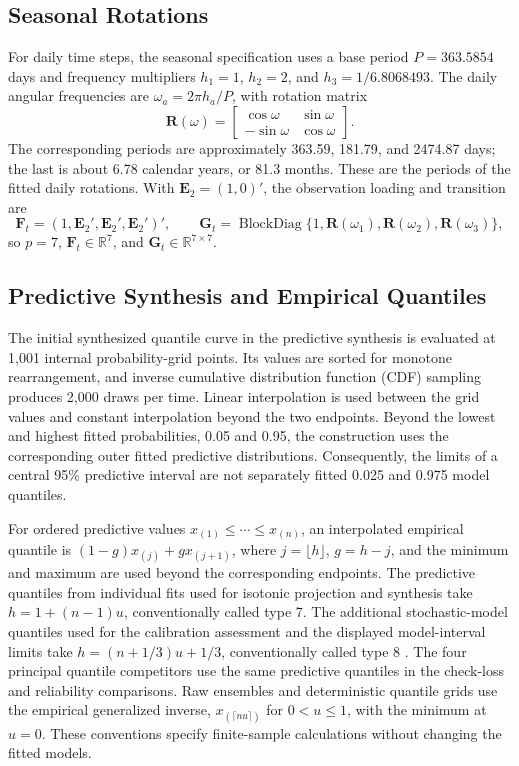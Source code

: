 \documentclass[APA,STIX1COL]{WileyNJD-v2}
\begin{document}
\subsection{Seasonal Rotations}
\label{app:seasonalconstruction}

For daily time steps, the seasonal specification uses a base period \(P=363.5854\) days and frequency multipliers \(h_1=1\), \(h_2=2\), and \(h_3=1/6.8068493\). The daily angular frequencies are \(\omega_a=2\pi h_a/P\), with rotation matrix
\[
\mathbf R(\omega)=
\begin{bmatrix}\cos\omega&\sin\omega\\-\sin\omega&\cos\omega\end{bmatrix}.
\]
The corresponding periods are approximately 363.59, 181.79, and 2474.87 days; the last is about 6.78 calendar years, or 81.3 months. These are the periods of the fitted daily rotations. With \(\mathbf E_2=(1,0)'\), the observation loading and transition are
\[
\mathbf F_t=(1,\mathbf E_2',\mathbf E_2',\mathbf E_2')',\qquad
\mathbf G_t=\operatorname{BlockDiag}\{1,\mathbf R(\omega_1),\mathbf R(\omega_2),\mathbf R(\omega_3)\},
\]
so \(p=7\), \(\mathbf F_t\in\mathbb R^7\), and \(\mathbf G_t\in\mathbb R^{7\times7}\).

\subsection{Predictive Synthesis and Empirical Quantiles}
\label{app:numericalprediction}

The initial synthesized quantile curve in the predictive synthesis is evaluated at 1,001 internal probability-grid points. Its values are sorted for monotone rearrangement, and inverse cumulative distribution function (CDF) sampling produces 2,000 draws per time. Linear interpolation is used between the grid values and constant interpolation beyond the two endpoints. Beyond the lowest and highest fitted probabilities, 0.05 and 0.95, the construction uses the corresponding outer fitted predictive distributions. Consequently, the limits of a central 95\% predictive interval are not separately fitted 0.025 and 0.975 model quantiles.

For ordered predictive values \(x_{(1)}\leq\cdots\leq x_{(n)}\), an interpolated empirical quantile is \((1-g)x_{(j)}+g x_{(j+1)}\), where \(j=\lfloor h\rfloor\), \(g=h-j\), and the minimum and maximum are used beyond the corresponding endpoints. The predictive quantiles from individual fits used for isotonic projection and synthesis take \(h=1+(n-1)u\), conventionally called type 7. The additional stochastic-model quantiles used for the calibration assessment and the displayed model-interval limits take \(h=(n+1/3)u+1/3\), conventionally called type 8 \citep{hyndman1996sample}. The four principal quantile competitors use the same predictive quantiles in the check-loss and reliability comparisons. Raw ensembles and deterministic quantile grids use the empirical generalized inverse, \(x_{(\lceil nu\rceil)}\) for \(0<u\leq1\), with the minimum at \(u=0\). These conventions specify finite-sample calculations without changing the fitted models.
\end{document}
